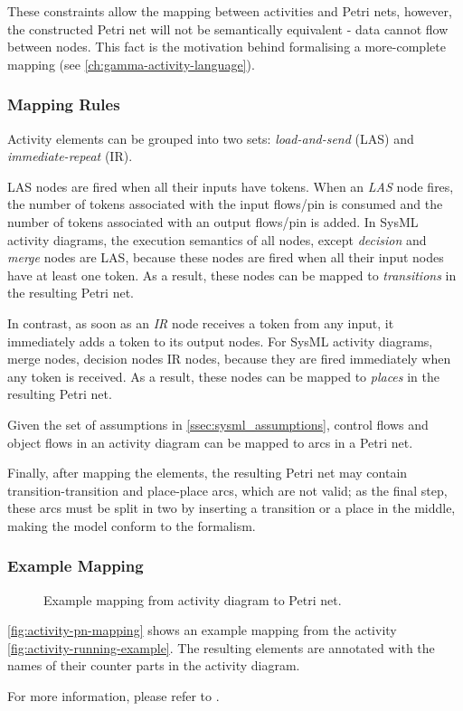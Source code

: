 These constraints allow the mapping between activities and Petri nets, however, the constructed Petri net will not be semantically equivalent - data cannot flow between nodes. This fact is the motivation behind formalising a more-complete mapping (see \autoref{ch:gamma-activity-language}).

\subsubsection*{Mapping Rules}

Activity elements can be grouped into two sets: \emph{load-and-send} (LAS) and \emph{immediate-repeat} (IR).

LAS nodes are fired when all their inputs have tokens. When an \emph{LAS} node fires, the number of tokens associated with the input flows/pin is consumed and the number of tokens associated with an output flows/pin is added. In SysML activity diagrams, the execution semantics of all nodes, except \emph{decision} and \emph{merge} nodes are LAS, because these nodes are fired when all their input nodes have at least one token. As a result, these nodes can be mapped to \emph{transitions} in the resulting Petri net.

In contrast, as soon as an \emph{IR} node receives a token from any input, it immediately adds a token to its output nodes. For SysML activity diagrams, merge nodes, decision nodes IR nodes, because they are fired immediately when any token is received. As a result, these nodes can be mapped to \emph{places} in the resulting Petri net.

Given the set of assumptions in \autoref{ssec:sysml_assumptions}, control flows and object flows in an activity diagram can be mapped to arcs in a Petri net.

Finally, after mapping the elements, the resulting Petri net may contain transition-transition and place-place arcs, which are not valid; as the final step, these arcs must be split in two by inserting a transition or a place in the middle, making the model conform to the formalism.

\subsubsection*{Example Mapping}

\begin{figure}[!ht]
	\centering
	
	\caption{Example mapping from activity diagram to Petri net.}
	\label{fig:activity-pn-mapping}
\end{figure}

\autoref{fig:activity-pn-mapping} shows an example mapping from the activity \autoref{fig:activity-running-example}. The resulting elements are annotated with the names of their counter parts in the activity diagram.

For more information, please refer to \cite{https://doi.org/10.1002/sys.21524}.